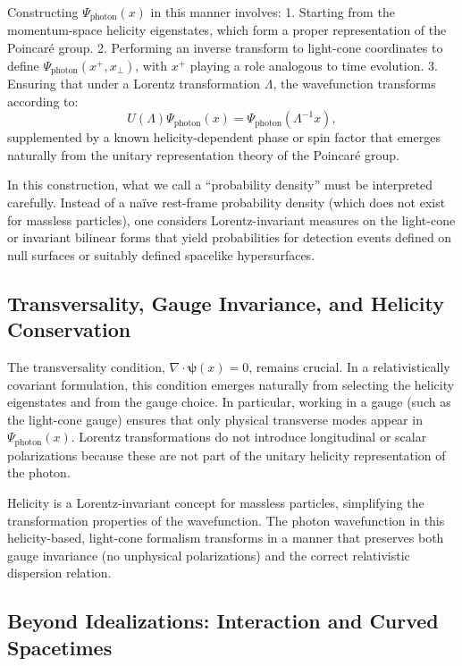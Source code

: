 \documentclass[aps,prl,twocolumn,showpacs,showkeys,superscriptaddress,amsmath,amssymb]{revtex4-2}
\begin{document}
Constructing $\Psi_{\text{photon}}(x)$ in this manner involves:
1. Starting from the momentum-space helicity eigenstates, which form a proper representation of the Poincaré group.
2. Performing an inverse transform to light-cone coordinates to define $\Psi_{\text{photon}}(x^+, x_\perp)$, with $x^+$ playing a role analogous to time evolution.
3. Ensuring that under a Lorentz transformation $\Lambda$, the wavefunction transforms according to:
   \begin{equation}
   U(\Lambda)\Psi_{\text{photon}}(x) = \Psi_{\text{photon}}(\Lambda^{-1}x),
   \end{equation}
   supplemented by a known helicity-dependent phase or spin factor that emerges naturally from the unitary representation theory of the Poincaré group.

In this construction, what we call a “probability density” must be interpreted carefully. Instead of a naïve rest-frame probability density (which does not exist for massless particles), one considers Lorentz-invariant measures on the light-cone or invariant bilinear forms that yield probabilities for detection events defined on null surfaces or suitably defined spacelike hypersurfaces.

\subsection{Transversality, Gauge Invariance, and Helicity Conservation}

The transversality condition, $\nabla \cdot \bm{\psi}(x) = 0$, remains crucial. In a relativistically covariant formulation, this condition emerges naturally from selecting the helicity eigenstates and from the gauge choice. In particular, working in a gauge (such as the light-cone gauge) ensures that only physical transverse modes appear in $\Psi_{\text{photon}}(x)$. Lorentz transformations do not introduce longitudinal or scalar polarizations because these are not part of the unitary helicity representation of the photon.

Helicity is a Lorentz-invariant concept for massless particles, simplifying the transformation properties of the wavefunction. The photon wavefunction in this helicity-based, light-cone formalism transforms in a manner that preserves both gauge invariance (no unphysical polarizations) and the correct relativistic dispersion relation.

\subsection{Beyond Idealizations: Interaction and Curved Spacetimes}
\end{document}

